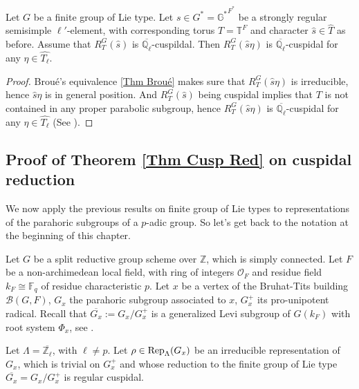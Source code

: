     \begin{lemma}\label{Lem Q_l-bar cuspidal}
    	Let $G$ be a finite group of Lie type. Let $s \in G^*=\mathbb{G^*}^{F^*}$ be a strongly regular semisimple $\ell'$-element, with corresponding torus $T=\mathbb{T}^F$ and character $\hat{s} \in \hat{T}$ as before. Assume that $R_T^G(\hat{s})$ is $\overline{\mathbb{Q}_{\ell}}$-cuspildal. Then $R_T^G(\hat{s}\eta)$ is $\overline{\mathbb{Q}_{\ell}}$-cuspidal for any $\eta \in \hat{T_{\ell}}$.
    \end{lemma}
    
    \begin{proof}
    	Broué's equivalence \ref{Thm Broué} makes sure that $R_T^G(\hat{s}\eta)$ is irreducible, hence $\hat{s}\eta$ is in general position. And $R_T^G(\hat{s})$ being cuspidal implies that $T$ is not contained in any proper parabolic subgroup, hence $R_T^G(\hat{s}\eta)$ is $\overline{\mathbb{Q}_{\ell}}$-cuspidal for any $\eta \in \hat{T_{\ell}}$ (See \cite[Theorem 9.3.2]{carter1985finite}).
    \end{proof}
    
	
	

	
	
	
	\subsection{Proof of Theorem \ref{Thm Cusp Red} on cuspidal reduction}
	
	We now apply the previous results on finite group of Lie types to representations of the parahoric subgroups of a $p$-adic group. So let's get back to the notation at the beginning of this chapter.
	
	Let $G$ be a split reductive group scheme over $\mathbb{Z}$, which is simply connected. Let $F$ be a non-archimedean local field, with ring of integers $\mathcal{O}_F$ and residue field $k_F \cong \mathbb{F}_q$ of residue characteristic $p$. Let $x$ be a vertex of the Bruhat-Tits building $\mathcal{B}(G, F)$, $G_x$ the parahoric subgroup associated to $x$, $G_x^+$ its pro-unipotent radical. Recall that $\overline{G_x}:=G_x/G_x^+$ is a generalized Levi subgroup of $G(k_F)$ with root system $\Phi_x$, see \cite[Theorem 3.17]{rabinoff2003bruhat}.
	
	Let $\Lambda=\overline{\mathbb{Z}_\ell}$, with $\ell \neq p$. Let $\rho \in \operatorname{\operatorname{Rep}}_{\Lambda}(G_x)$ be an irreducible representation of $G_x$, which is trivial on $G_x^+$ and whose reduction to the finite group of Lie type $\overline{G_x}=G_x/G_x^+$ is regular cuspidal. 
	
